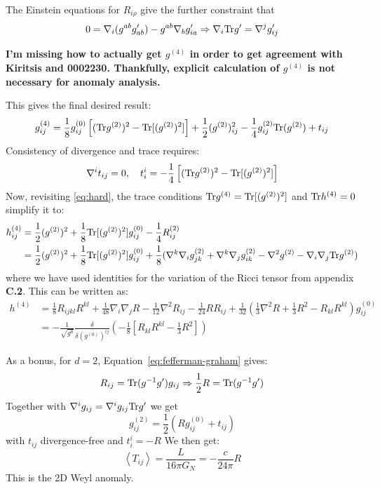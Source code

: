 \documentclass[11pt, class=article, crop=false]{standalone}
\begin{document}
\begin{enumerate}
	The Einstein equations for $R_{i\rho}$ give the further constraint that
	\[
		0 = \nabla_i (g^{ab} g'_{ab}) - g^{ab} \nabla_b g_{ia}' \Rightarrow \nabla_i \mathrm{Tr} g' = \nabla^j g'_{ij}
	\]
	
	\textbf{I'm missing how to actually get $g^{(4)}$ in order to get agreement with Kiritsis and 0002230. Thankfully, explicit calculation of $g^{(4)}$ is not necessary for anomaly analysis.}
	
	This gives the final desired result:
	\[
		g^{(4)}_{ij} = \frac18 g^{(0)}_{ij} \left[(\mathrm{Tr} g^{(2)})^2 - \mathrm{Tr}[(g^{(2)})^2]\right] + \frac12 (g^{(2)})^2_{ij} - \frac14 g_{ij}^{(2)} \mathrm{Tr}(g^{(2)}) + t_{ij}
	\]
	Consistency of divergence and trace requires:
	\[
		\nabla^i t_{ij} = 0, \quad t^i_i = -\frac14 \left[(\mathrm{Tr} g^{(2)})^2 - \mathrm{Tr}[(g^{(2)})^2]\right]
	\]
	Now, revisiting \eqref{eq:hard}, the trace conditions $\mathrm{Tr} g^{(4)} = \mathrm{Tr}[ (g^{(2)})^2]$ and $\mathrm{Tr} h^{(4)} =0$ simplify it to:
	\[
	\begin{aligned}
		h_{ij}^{(4)} &= \frac12 (g^{(2)})^2 + \frac18 \mathrm{Tr}[(g^{(2)})^2] g^{(0)}_{ij} - \frac14 R_{ij}^{(2)}\\
		& = \frac12 (g^{(2)})^2 + \frac18 \mathrm{Tr}[(g^{(2)})^2] g^{(0)}_{ij} + \frac18 (\nabla^k \nabla_{i} g_{j k}^{(2)} + \nabla^k \nabla_{j} g_{i k}^{(2)}  - \nabla^2 g^{(2)} -\nabla_i \nabla_j \mathrm{Tr} g^{(2)})
	\end{aligned}
	\]
	where we have used identities for the variation of the Ricci tensor from appendix \textbf{C.2}. This can be written as:
	\[
	\begin{aligned}
h^{(4)}&= \frac18 R_{ijkl} R^{kl} + \frac{1}{48} \nabla_i \nabla_j R - \frac{1}{12} \nabla^2 R_{ij} - \frac{1}{24} R R_{ij} + \frac{1}{32} \left(\frac13 \nabla^2 R + \frac13 R^2 - R_{kl} R^{kl} \right) g^{(0)}_{ij}\\
&= - \frac{1}{\sqrt{g^{0}}} \frac{\delta}{\delta (g^{(0)})^{ij}} \left(- \frac18 \left[R_{kl} R^{kl} - \frac13 R^2 \right]\right)
	\end{aligned}
	\]

	
	As a bonus, for $d=2$, Equation~\eqref{eq:fefferman-graham} gives:
	\[
		R_{ij} = \Tr(g^{-1} g') g_{ij} \Rightarrow \frac12 R = \Tr(g^{-1} g') %
	\]
	Together with $\nabla^i g_{ij} = \nabla^i g_{ij} \mathrm{Tr} g'$ we get 
	\[
		g^{(2)}_{ij} = \frac12 (R g^{(0)}_{ij} + t_{ij})
	\]
	with $t_{ij}$ divergence-free and $t^i_i = - R$
	We then get:
	\[
		\left< T_{ij} \right> = \frac{L}{16 \pi G_{N}} = - \frac{c}{24 \pi} R
	\]
	This is the 2D Weyl anomaly. 
	

\end{enumerate}
\end{document}
